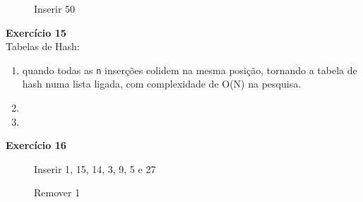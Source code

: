 \documentclass[a4paper,11pt]{article}
\begin{document}
\begin{figure}[H]
	\centering
	\caption{Inserir 50}
\end{figure}


\noindent \textbf{Exercício 15}\\

\noindent Tabelas de Hash:
\begin{enumerate}[label=\alph*)]
	\item quando todas as \texttt{n} inserções colidem na mesma posição, tornando a tabela de hash numa lista ligada, com complexidade de O(N) na pesquisa.
	\item 
	\item
\end{enumerate}

\noindent \textbf{Exercício 16}

\begin{figure}[H]
	\centering
	\caption{Inserir 1, 15, 14, 3, 9, 5 e 27}
\end{figure}

\begin{figure}[H]
	\centering
	\caption{Remover 1}
\end{figure}
\end{document}
